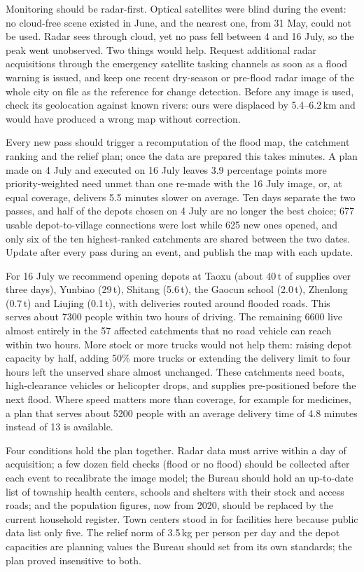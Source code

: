\documentclass[bwprint]{apmcmthesis}
\begin{document}
Monitoring should be radar-first. Optical satellites were blind during the event: no cloud-free scene existed in June, and the nearest one, from 31 May, could not be used. Radar sees through cloud, yet no pass fell between 4 and 16 July, so the peak went unobserved. Two things would help. Request additional radar acquisitions through the emergency satellite tasking channels as soon as a flood warning is issued, and keep one recent dry-season or pre-flood radar image of the whole city on file as the reference for change detection. Before any image is used, check its geolocation against known rivers: ours were displaced by 5.4--6.2\,km and would have produced a wrong map without correction.

Every new pass should trigger a recomputation of the flood map, the catchment ranking and the relief plan; once the data are prepared this takes minutes. A plan made on 4 July and executed on 16 July leaves 3.9 percentage points more priority-weighted need unmet than one re-made with the 16 July image, or, at equal coverage, delivers 5.5 minutes slower on average. Ten days separate the two passes, and half of the depots chosen on 4 July are no longer the best choice; 677 usable depot-to-village connections were lost while 625 new ones opened, and only six of the ten highest-ranked catchments are shared between the two dates. Update after every pass during an event, and publish the map with each update.

For 16 July we recommend opening depots at Taoxu (about 40\,t of supplies over three days), Yunbiao (29\,t), Shitang (5.6\,t), the Gaocun school (2.0\,t), Zhenlong (0.7\,t) and Liujing (0.1\,t), with deliveries routed around flooded roads. This serves about 7300 people within two hours of driving. The remaining 6600 live almost entirely in the 57 affected catchments that no road vehicle can reach within two hours. More stock or more trucks would not help them: raising depot capacity by half, adding 50\% more trucks or extending the delivery limit to four hours left the unserved share almost unchanged. These catchments need boats, high-clearance vehicles or helicopter drops, and supplies pre-positioned before the next flood. Where speed matters more than coverage, for example for medicines, a plan that serves about 5200 people with an average delivery time of 4.8 minutes instead of 13 is available.

Four conditions hold the plan together. Radar data must arrive within a day of acquisition; a few dozen field checks (flood or no flood) should be collected after each event to recalibrate the image model; the Bureau should hold an up-to-date list of township health centers, schools and shelters with their stock and access roads; and the population figures, now from 2020, should be replaced by the current household register. Town centers stood in for facilities here because public data list only five. The relief norm of 3.5\,kg per person per day and the depot capacities are planning values the Bureau should set from its own standards; the plan proved insensitive to both.
\end{document}
